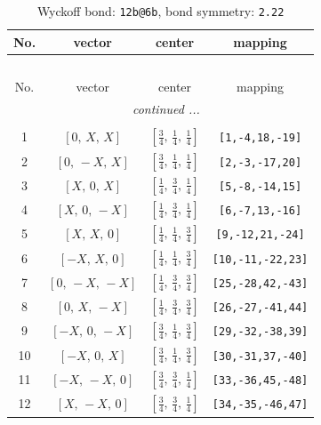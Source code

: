 \documentclass[fleqn,8pt]{jsarticle}
\begin{document}
\begin{longtable}{cccc}
\caption{Wyckoff bond: {\tt 12b@6b}, bond symmetry: {\tt 2.22}}
 \\
 \hline \hline
No. & vector & center & mapping \\ \hline \endfirsthead

\multicolumn{3}{l}{\tablename\ \thetable{}} \\
 \hline \hline
No. & vector & center & mapping \\ \hline \endhead

 \hline \hline
\multicolumn{3}{r}{\footnotesize\it continued ...} \\ \endfoot

 \hline \hline
\multicolumn{3}{r}{} \\ \endlastfoot

1 & $\left[ 0,\, X,\, X \right]$ & $\left[ \frac{3}{4},\, \frac{1}{4},\, \frac{1}{4} \right]$ & {\tt [1,-4,18,-19]} \\ \hline
2 & $\left[ 0,\, - X,\, X \right]$ & $\left[ \frac{3}{4},\, \frac{1}{4},\, \frac{1}{4} \right]$ & {\tt [2,-3,-17,20]} \\ \hline
3 & $\left[ X,\, 0,\, X \right]$ & $\left[ \frac{1}{4},\, \frac{3}{4},\, \frac{1}{4} \right]$ & {\tt [5,-8,-14,15]} \\ \hline
4 & $\left[ X,\, 0,\, - X \right]$ & $\left[ \frac{1}{4},\, \frac{3}{4},\, \frac{1}{4} \right]$ & {\tt [6,-7,13,-16]} \\ \hline
5 & $\left[ X,\, X,\, 0 \right]$ & $\left[ \frac{1}{4},\, \frac{1}{4},\, \frac{3}{4} \right]$ & {\tt [9,-12,21,-24]} \\ \hline
6 & $\left[ - X,\, X,\, 0 \right]$ & $\left[ \frac{1}{4},\, \frac{1}{4},\, \frac{3}{4} \right]$ & {\tt [10,-11,-22,23]} \\ \hline
7 & $\left[ 0,\, - X,\, - X \right]$ & $\left[ \frac{1}{4},\, \frac{3}{4},\, \frac{3}{4} \right]$ & {\tt [25,-28,42,-43]} \\ \hline
8 & $\left[ 0,\, X,\, - X \right]$ & $\left[ \frac{1}{4},\, \frac{3}{4},\, \frac{3}{4} \right]$ & {\tt [26,-27,-41,44]} \\ \hline
9 & $\left[ - X,\, 0,\, - X \right]$ & $\left[ \frac{3}{4},\, \frac{1}{4},\, \frac{3}{4} \right]$ & {\tt [29,-32,-38,39]} \\ \hline
10 & $\left[ - X,\, 0,\, X \right]$ & $\left[ \frac{3}{4},\, \frac{1}{4},\, \frac{3}{4} \right]$ & {\tt [30,-31,37,-40]} \\ \hline
11 & $\left[ - X,\, - X,\, 0 \right]$ & $\left[ \frac{3}{4},\, \frac{3}{4},\, \frac{1}{4} \right]$ & {\tt [33,-36,45,-48]} \\ \hline
12 & $\left[ X,\, - X,\, 0 \right]$ & $\left[ \frac{3}{4},\, \frac{3}{4},\, \frac{1}{4} \right]$ & {\tt [34,-35,-46,47]} \\
\end{longtable}
\end{document}
